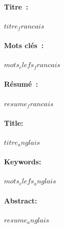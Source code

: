 \documentclass[12pt,a4paper]{reedthesis}
\begin{document}
\lhead{}
\rhead{}
\rfoot{}
\cfoot{}
\lfoot{}

\noindent

\begin{mdframed}[linecolor=Prune,linewidth=1]
\vspace{-.25cm}
\paragraph*{Titre~:} $titre_francais$
\begin{small}
\vspace{-.25cm}
\paragraph*{Mots clés~:} $mots_clefs_francais$

\vspace{-.5cm}
\begin{multicols}{2}
\paragraph*{Résumé~:} $resume_francais$
\end{multicols}
\end{small}
\end{mdframed}

\begin{mdframed}[linecolor=Prune,linewidth=1]
\vspace{-.25cm}
\paragraph*{Title:} $titre_anglais$

\begin{small}
\vspace{-.25cm}
\paragraph*{Keywords:} $mots_clefs_anglais$

\vspace{-.5cm}
\begin{multicols}{2}
\paragraph*{Abstract:} $resume_anglais$
\end{multicols}
\end{small}
\end{mdframed}
\end{document}
